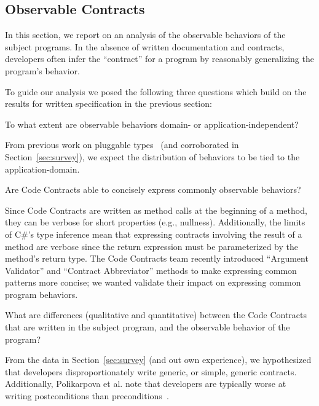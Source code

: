 
\subsection{Observable Contracts}
\label{sec:celeriac}

In this section, we report on an analysis of the observable behaviors
of the subject programs.
%
In the absence of written documentation and contracts, developers
often infer the ``contract'' for a program by reasonably generalizing
the program's behavior.

To guide our analysis we posed the following three questions which
build on the results for written specification in the previous section:

\begin{research-question}
  To what extent are observable behaviors domain- or
  application-independent?
\end{research-question}

From previous work on pluggable types~\cite{DietlDEMS2011} (and
corroborated in Section~\ref{sec:survey}), we expect the distribution
of behaviors to be tied to the application-domain.

\begin{research-question}
  Are Code Contracts able to concisely express commonly observable
  behaviors?
\end{research-question}

Since Code Contracts are written as method calls at the beginning of
a method, they can be verbose for short properties (e.g.,
nullness). Additionally, the limits of C\#'s type inference mean that
expressing contracts involving the result of a method are verbose
since the return expression must be parameterized by the method's
return type.
%
The Code Contracts team recently introduced ``Argument Validator'' and
``Contract Abbreviator'' methods to make expressing common patterns
more concise; we wanted validate their impact on expressing common
program behaviors.

\begin{research-question}
  What are differences (qualitative and quantitative) between the Code
  Contracts that are written in the subject program, and the observable
  behavior of the program?
\end{research-question}

From the data in Section~\ref{sec:survey} (and out own experience), we
hypothesized that developers disproportionately write generic, or
simple, generic contracts. Additionally, Polikarpova et al. note that
developers are typically worse at writing postconditions than
preconditions~\cite{Polikarpova2012}.

